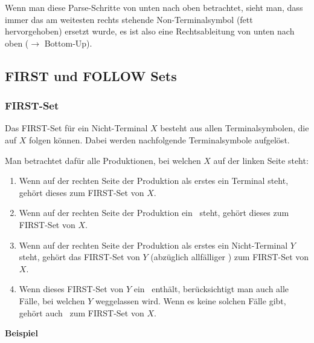 Wenn man diese Parse-Schritte von unten nach oben betrachtet, sieht man, dass immer das am weitesten
rechts stehende Non-Terminalsymbol (fett hervorgehoben) ersetzt wurde, es ist also eine
Rechtsableitung von unten nach oben ($\rightarrow$ Bottom-Up).


\subsection{FIRST und FOLLOW Sets}

\subsubsection{FIRST-Set}

Das FIRST-Set für ein Nicht-Terminal $X$ besteht aus allen Terminalsymbolen, die auf $X$ folgen können.
Dabei werden nachfolgende Terminalsymbole aufgelöst.

Man betrachtet dafür alle Produktionen, bei welchen $X$ auf der linken Seite steht:

\begin{enumerate}
	\item Wenn auf der rechten Seite der Produktion als erstes ein Terminal steht, gehört dieses
		zum FIRST-Set von $X$.
	\item Wenn auf der rechten Seite der Produktion ein \textepsilon\ steht, gehört dieses zum
		FIRST-Set von $X$.
	\item Wenn auf der rechten Seite der Produktion als erstes ein Nicht-Terminal $Y$ steht, gehört
		das FIRST-Set von $Y$ (abzüglich allfälliger \textepsilon) zum FIRST-Set von $X$.
	\item Wenn dieses FIRST-Set von $Y$ ein \textepsilon\ enthält, berücksichtigt man auch alle Fälle,
		bei welchen $Y$ weggelassen wird. Wenn es keine solchen Fälle gibt, gehört auch
		\textepsilon\ zum FIRST-Set von $X$.
\end{enumerate}

\textbf{Beispiel}

